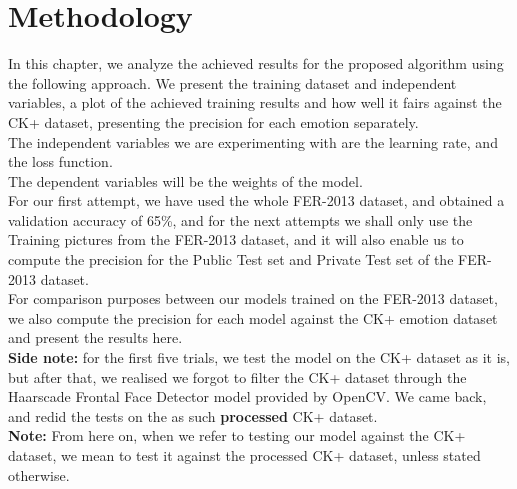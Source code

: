 \documentclass[runningheads,a4paper,11pt]{report}
\begin{document}
\section{Methodology}
\label{section:meth}
In this chapter, we analyze the achieved results for the proposed algorithm using the following approach. We present the training dataset and independent variables, a plot of the achieved training results and how well it fairs against the CK+ dataset, presenting the precision for each emotion separately.\\
The independent variables we are experimenting with are the learning rate, and the loss function.\\
The dependent variables will be the weights of the model.\\
For our first attempt, we have used the whole FER-2013 dataset, and obtained a validation accuracy of 65\%, and for the next attempts we shall only use the Training pictures from the FER-2013 dataset, and it will also enable us to compute the precision for the Public Test set and Private Test set of the FER-2013 dataset.\\ 
For comparison purposes between our models trained on the FER-2013 dataset, we also compute the precision for each model against the CK+ emotion dataset and present the results here. \\
\textbf{Side note:} for the first five trials, we test the model on the CK+ dataset as it is, but after that, we realised we forgot to filter the CK+ dataset through the Haarscade Frontal Face Detector model provided by OpenCV. We came back, and redid the tests on the as such \textbf{processed} CK+ dataset.\\
\textbf{Note:} From here on, when we refer to testing our model against the CK+ dataset, we mean to test it against the processed CK+ dataset, unless stated otherwise.
\end{document}
